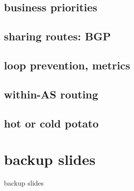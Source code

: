 \subsection{business priorities}

\subsection{sharing routes: BGP}

\subsection{loop prevention, metrics}

\subsection{within-AS routing}

\subsection{hot or cold potato}

\section{backup slides}
\begin{frame}{backup slides}
\end{frame}


